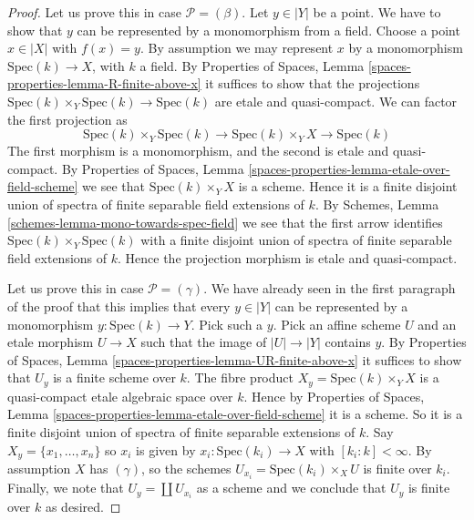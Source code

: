 \begin{proof}
Let us prove this in case $\mathcal{P} = (\beta)$. Let $y \in |Y|$ be
a point. We have to show that $y$ can be represented by a monomorphism
from a field. Choose a point $x \in |X|$ with $f(x) = y$.
By assumption we may represent $x$ by a monomorphism
$\text{Spec}(k) \to X$, with $k$ a field. By
Properties of Spaces,
Lemma \ref{spaces-properties-lemma-R-finite-above-x}
it suffices to show that the projections
$\text{Spec}(k) \times_Y \text{Spec}(k) \to \text{Spec}(k)$
are etale and quasi-compact. We can factor the first projection as
$$
\text{Spec}(k) \times_Y \text{Spec}(k)
\longrightarrow
\text{Spec}(k) \times_Y X
\longrightarrow
\text{Spec}(k)
$$
The first morphism is a monomorphism, and the second is etale and
quasi-compact. By
Properties of Spaces,
Lemma \ref{spaces-properties-lemma-etale-over-field-scheme}
we see that $\text{Spec}(k) \times_Y X$ is a scheme. Hence it is a
finite disjoint union of spectra of finite separable field extensions
of $k$. By
Schemes, Lemma \ref{schemes-lemma-mono-towards-spec-field}
we see that the first arrow identifies
$\text{Spec}(k) \times_Y \text{Spec}(k)$ with a finite disjoint
union of spectra of finite separable field extensions of $k$.
Hence the projection morphism is etale and quasi-compact.

\medskip\noindent
Let us prove this in case $\mathcal{P} = (\gamma)$.
We have already seen in the first paragraph of the proof that this implies
that every $y \in |Y|$ can be represented by a monomorphism
$y : \text{Spec}(k) \to Y$. Pick such a $y$. Pick an affine
scheme $U$ and an etale morphism $U \to X$ such that the image
of $|U| \to |Y|$ contains $y$. By
Properties of Spaces,
Lemma \ref{spaces-properties-lemma-UR-finite-above-x}
it suffices to show that $U_y$ is a finite scheme over $k$. The fibre
product $X_y = \text{Spec}(k) \times_Y X$ is a quasi-compact etale
algebraic space over $k$. Hence by
Properties of Spaces,
Lemma \ref{spaces-properties-lemma-etale-over-field-scheme}
it is a scheme. So it is a finite disjoint union of spectra of
finite separable extensions of $k$. Say $X_y = \{x_1, \ldots, x_n\}$
so $x_i$ is given by  $x_i : \text{Spec}(k_i) \to X$ with
$[k_i : k] < \infty$. By assumption $X$ has $(\gamma)$, so the schemes
$U_{x_i} = \text{Spec}(k_i) \times_X U$ is finite over $k_i$.
Finally, we note that $U_y = \coprod U_{x_i}$ as a scheme and we conclude
that $U_y$ is finite over $k$ as desired.


\end{proof}
